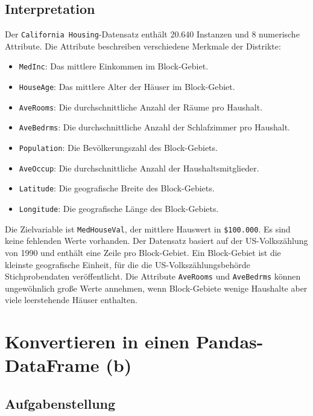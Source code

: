 \subsection{Interpretation}

Der \texttt{California Housing}-Datensatz enthält 20.640 Instanzen und 8 numerische Attribute. Die Attribute beschreiben verschiedene Merkmale der Distrikte:

\begin{itemize}
    \item \texttt{MedInc}: Das mittlere Einkommen im Block-Gebiet.
    \item \texttt{HouseAge}: Das mittlere Alter der Häuser im Block-Gebiet.
    \item \texttt{AveRooms}: Die durchschnittliche Anzahl der Räume pro Haushalt.
    \item \texttt{AveBedrms}: Die durchschnittliche Anzahl der Schlafzimmer pro Haushalt.
    \item \texttt{Population}: Die Bevölkerungszahl des Block-Gebiets.
    \item \texttt{AveOccup}: Die durchschnittliche Anzahl der Haushaltsmitglieder.
    \item \texttt{Latitude}: Die geografische Breite des Block-Gebiets.
    \item \texttt{Longitude}: Die geografische Länge des Block-Gebiets.
\end{itemize}

Die Zielvariable ist \texttt{MedHouseVal}, der mittlere Hauswert in \texttt{\$100.000}. Es sind keine fehlenden Werte vorhanden. Der Datensatz basiert auf der \acs{US}-Volkszählung von 1990 und enthält eine Zeile pro Block-Gebiet. Ein Block-Gebiet ist die kleinste geografische Einheit, für die die \acs{US}-Volkszählungsbehörde Stichprobendaten veröffentlicht. Die Attribute \texttt{AveRooms} und \texttt{AveBedrms} können ungewöhnlich große Werte annehmen, wenn Block-Gebiete wenige Haushalte aber viele leerstehende Häuser enthalten.

\cleardoublepage


\section{Konvertieren in einen Pandas-DataFrame (b)}
\label{sec:2b}

\subsection{Aufgabenstellung}

